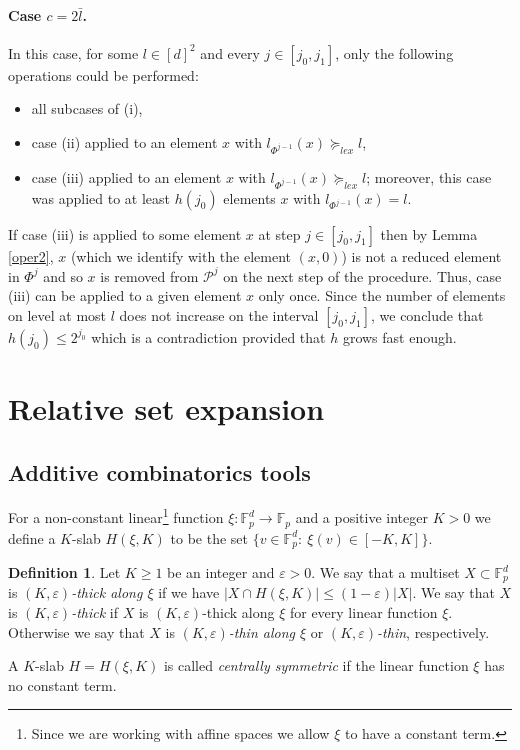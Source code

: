 \documentclass{daj}
\renewcommand{\le}{\leqslant}
\renewcommand{\ge}{\geqslant}
\newcommand{\FF}{\mathbb F}
\renewcommand{\P}{\mathcal P}
\theoremstyle{definition}
\newtheorem{defi}[theorem]{Definition}
\theoremstyle{remark}
\theoremstyle{definition}
\theoremstyle{definition}
\newcommand{\red}[1]{{\color{red}#1}}
\begin{document}
\paragraph{Case $c = 2 \bar l$.} In this case, for some $l \in [d]^2$ and every $j \in [j_0, j_1]$, only the following operations could be performed: 
\begin{itemize}
    \item all subcases of (i),
    \item case (ii) applied to an element $x$ with $l_{\Phi^{j-1}}(x) \succeq_{lex} l$, 
    \item case (iii) applied to an element $x$ with $l_{\Phi^{j-1}}(x) \succeq_{lex} l$; moreover, this case was applied to at least $h(j_0)$ elements $x$ with $l_{\Phi^{j-1}}(x) = l$.
\end{itemize} 

If case (iii) is applied to some element $x$ at step $j \in [j_0, j_1]$ then by Lemma \ref{oper2}, $x$ (which we identify with the element $(x, 0)$) is not a reduced element in $\Phi^j$ and so $x$ is removed from $\P^{j}$ on the next step of the procedure. Thus, case (iii) can be applied to a given element $x$ only once. Since the number of elements on level at most $l$ does not increase on the interval $[j_0, j_1]$, we conclude that $h(j_0) \le 2^{j_0}$ which is a contradiction provided that $h$ grows fast enough.



\section{Relative set expansion}\label{set_expansion}

\subsection{Additive combinatorics tools}\label{exp}

For a non-constant linear\footnote{Since we are working with affine spaces we allow $\xi$ to have a constant term.} function $\xi: \FF_p^d \rightarrow \FF_p$ and a positive integer $K > 0$ we define a $K$-slab $H(\xi, K)$ to be the set $\{v \in \FF_p^d: ~ \xi( v ) \in [-K, K] \}$. 

\begin{defi}\label{defthick}
Let  $K \ge 1$ be an integer and $\varepsilon > 0$. We say that a multiset $X \subset \FF_p^d$ is {\em $(K, \varepsilon)$-thick along $\xi$} if we have $|X \cap H(\xi, K)| \le (1 - \varepsilon)|X|$.
We say that $X$ is {\em $(K, \varepsilon)$-thick} if $X$ is $(K, \varepsilon)$-thick along $\xi$ for every linear function $\xi$.  Otherwise we say that $X$ is {\em $(K, \varepsilon)$-thin along $\xi$} or {\em $(K, \varepsilon)$-thin}, respectively. 

A $K$-slab $H=H(\xi, K)$ is called {\em centrally symmetric} if the linear function $\xi$ has no constant term.
\end{defi}
\end{document}
